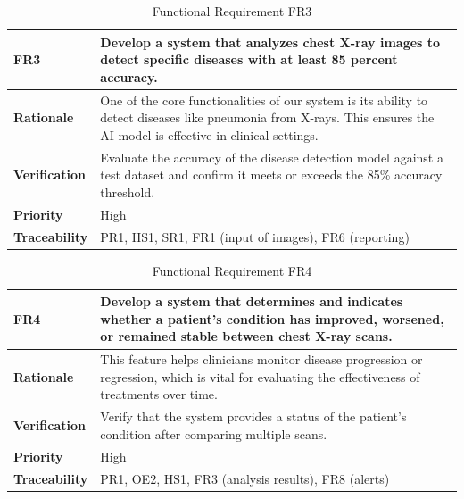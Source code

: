 \documentclass[12pt]{article}
\begin{document}
\begin{table}[h!]
\centering
{}
\begin{tabular}{|p{3.5cm}|p{11.5cm}|}
\hline
\rowcolor{gray!30}
\textbf{FR3} & Develop a system that analyzes chest X-ray images to detect specific diseases with at least 85 percent accuracy. \\
\hline
\textbf{Rationale} & One of the core functionalities of our system is its ability to detect diseases like pneumonia from X-rays. This ensures the AI model is effective in clinical settings. \\
\hline
\textbf{Verification} & Evaluate the accuracy of the disease detection model against a test dataset and confirm it meets or exceeds the 85\% accuracy threshold. \\
\hline
\textbf{Priority} & High \\
\hline
\textbf{Traceability} & PR1, HS1, SR1, FR1 (input of images), FR6 (reporting) \\
\hline
\end{tabular}
\caption{Functional Requirement FR3}
\end{table}
\begin{table}[h!]
\centering
{}
\begin{tabular}{|p{3.5cm}|p{11.5cm}|}
\hline
\rowcolor{gray!30}
\textbf{FR4} & Develop a system that determines and indicates whether a patient's condition has improved, worsened, or remained stable between chest X-ray scans. \\
\hline
\textbf{Rationale} & This feature helps clinicians monitor disease progression or regression, which is vital for evaluating the effectiveness of treatments over time.\\
\hline
\textbf{Verification} & Verify that the system provides a status of the patient's condition after comparing multiple scans. \\
\hline
\textbf{Priority} & High \\
\hline
\textbf{Traceability} & PR1, OE2, HS1, FR3 (analysis results), FR8 (alerts) \\
\hline
\end{tabular}
\caption{Functional Requirement FR4}
\end{table}
\end{document}
